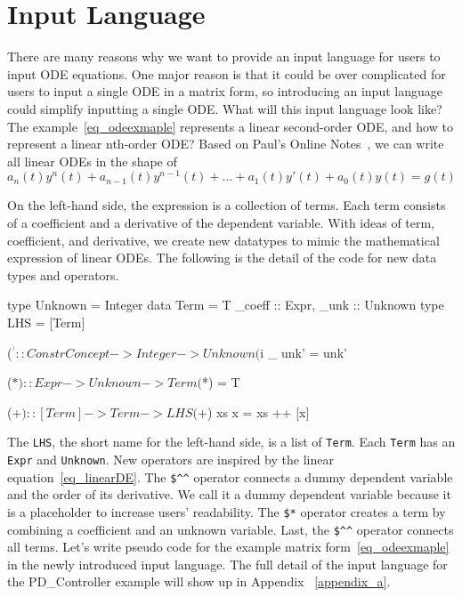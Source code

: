 \section{Input Language}
\label{sec_input}
There are many reasons why we want to provide an input language for users to input ODE equations. One major reason is that it could be over complicated for users to input a single ODE in a matrix form, so introducing an input language could simplify inputting a single ODE. What will this input language look like? The example~\ref{eq_odeexmaple} represents a linear second-order ODE, and how to represent a linear nth-order ODE? Based on Paul's Online Notes~\citep{paullinearode}, we can write all linear ODEs in the shape of 
\begin{equation} \label{eq_linearDE}
	a_n(t)y^n(t) + a_{n-1}(t)y^{n-1}(t) + \dots + a_1(t)y'(t) + a_0(t)y(t) = g(t)
\end{equation}

On the left-hand side, the expression is a collection of terms. Each term consists of a coefficient and a derivative of the dependent variable. With ideas of term, coefficient, and derivative, we create new datatypes to mimic the mathematical expression of linear ODEs. The following is the detail of the code for new data types and operators.

\begin{haskell1}
type Unknown = Integer
data Term = T{
	_coeff :: Expr,
	_unk :: Unknown
}
type LHS = [Term]

($^^) :: ConstrConcept -> Integer -> Unknown
($^^) _ unk' = unk'

($*) :: Expr -> Unknown -> Term
($*) = T

($+) :: [Term] -> Term -> LHS
($+) xs x  = xs ++ [x]
\end{haskell1}

The \verb|LHS|, the short name for the left-hand side, is a list of \verb|Term|. Each \verb|Term| has an \verb|Expr| and \verb|Unknown|. New operators are inspired by the linear equation~\ref{eq_linearDE}. The \verb|$^^| operator connects a dummy dependent variable and the order of its derivative. We call it a dummy dependent variable because it is a placeholder to increase users' readability. The \verb|$*| operator creates a term by combining a coefficient and an unknown variable. Last, the \verb|$^^| operator connects all terms. Let's write pseudo code for the example matrix form~\ref{eq_odeexmaple} in the newly introduced input language. The full detail of the input language for the PD\_Controller example will show up in Appendix ~\ref{appendix_a}.

